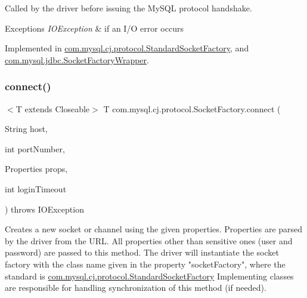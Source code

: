 Called by the driver before issuing the My\+S\+QL protocol handshake.


\begin{DoxyExceptions}{Exceptions}
{\em I\+O\+Exception} & if an I/O error occurs \\
\hline
\end{DoxyExceptions}


Implemented in \mbox{\hyperlink{classcom_1_1mysql_1_1cj_1_1protocol_1_1_standard_socket_factory_a4e13a5c155c986e139058ab3933017fe}{com.\+mysql.\+cj.\+protocol.\+Standard\+Socket\+Factory}}, and \mbox{\hyperlink{classcom_1_1mysql_1_1jdbc_1_1_socket_factory_wrapper_a6c39038cbdf685cde6e0ce84cecde918}{com.\+mysql.\+jdbc.\+Socket\+Factory\+Wrapper}}.

\mbox{\label{interfacecom_1_1mysql_1_1cj_1_1protocol_1_1_socket_factory_a5c3f8f7b05e5ca6bdab1701cd5c24f83}} 
\subsubsection{\texorpdfstring{connect()}{connect()}}
{\footnotesize\ttfamily $<$T extends Closeable$>$ T com.\+mysql.\+cj.\+protocol.\+Socket\+Factory.\+connect (\begin{DoxyParamCaption}\item[{String}]{host,  }\item[{int}]{port\+Number,  }\item[{Properties}]{props,  }\item[{int}]{login\+Timeout }\end{DoxyParamCaption}) throws I\+O\+Exception}

Creates a new socket or channel using the given properties. Properties are parsed by the driver from the U\+RL. All properties other than sensitive ones (user and password) are passed to this method. The driver will instantiate the socket factory with the class name given in the property "socket\+Factory", where the standard is {\ttfamily \mbox{\hyperlink{classcom_1_1mysql_1_1cj_1_1protocol_1_1_standard_socket_factory}{com.\+mysql.\+cj.\+protocol.\+Standard\+Socket\+Factory}}} Implementing classes are responsible for handling synchronization of this method (if needed).


